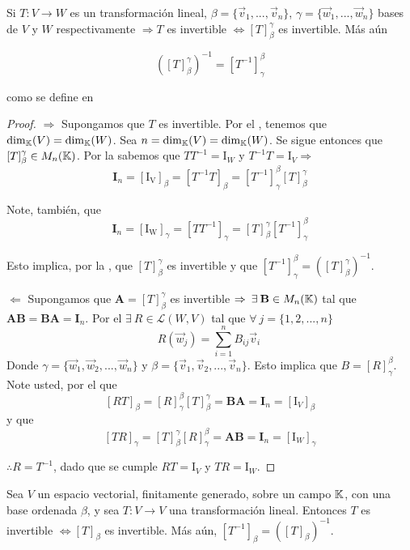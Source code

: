 \begin{theorem} \label{theomostro}
    Si $T : V \to W$ es un transformación lineal, $\beta = \{ \vec{v}_{1}, ..., \vec{v}_{n} \}$, $\gamma = \{ \vec{w}_{1}, ..., \vec{w}_{n} \}$ bases de $V$ y $W$ respectivamente $\Rightarrow T$ es invertible $\iff {[T]}_{\beta}^{\gamma}$ es invertible. Más aún

    $${\left( {[T]}_{\beta}^{\gamma} \right)}^{-1} = {\left[{T}^{-1} \right]}_{\gamma}^{\beta}$$

    como se define en 
\end{theorem}

\begin{proof}
    $\Rightarrow$ Supongamos que $T$ es invertible. Por el , tenemos que $\dim_{\mathbb{K}}(V)=\dim_{\mathbb{K}}(W)$. Sea $n=\dim_{\mathbb{K}}(V)=\dim_{\mathbb{K}}(W)$. Se sigue entonces que $[T]_{\beta}^{\gamma} \in M_{n}(\mathbb{K})$. Por la  sabemos que $TT^{-1}=\mathrm{I}_W $ y $ T^{-1}T=\mathrm{I}_V \Rightarrow$     
    $$ {\textbf{I}}_{n}=[\mathrm{I_V}]_{\beta}=[T^{-1}T]_{\beta}=[T^{-1}]_{\gamma}^{\beta} [T]_{\beta}^{\gamma}$$ 
    
    Note, también, que 
    $${\textbf{I}}_{n}=[\mathrm{I_W}]_{\gamma}=[TT^{-1}]_{\gamma}=[T]_{\beta}^{\gamma} [T^{-1}]_{\gamma}^{\beta}$$ 
    
    Esto implica, por la  , que $[T]_{\beta}^{\gamma}$ es invertible y que $[T^{-1}]_{\gamma}^{\beta}=([T]_{\beta}^{\gamma})^{-1}$. 
    
    $\Leftarrow$ Supongamos que $\textbf{A}=[T]_{\beta}^{\gamma}$ es invertible $\Rightarrow \: \exists \: \textbf{B} \in M_n(\mathbb{K})$ tal que $\textbf{AB}=\textbf{BA}={\textbf{I}}_{n}$. Por el  $\exists \: R \in \mathscr{L}(W,V)$ tal que $\forall \:  j=\{1,2,...,n\}$
    $$R(\vec{w}_j)=\sum_{i=1}^nB_{ij}\vec{v}_i \ $$ 
    Donde $\gamma=\{\vec{w}_1,\vec{w}_2,...,\vec{w}_n\}$ y $\beta=\{\vec{v}_1,\vec{v}_2,...,\vec{v}_n\}$. Esto implica que $B=[R]_{\gamma}^{\beta}$. Note usted, por el  que 
    $$[RT]_{\beta}=[R]_{\gamma}^{\beta}[T]_{\beta}^{\gamma}=\textbf{BA}={\textbf{I}}_{n}=[\mathrm{I}_V]_\beta$$ 
    y que 
    $$[TR]_{\gamma}=[T]_{\beta}^{\gamma}[R]_{\gamma}^{\beta}=\textbf{AB}={\textbf{I}}_{n}=[\mathrm{I}_W]_\gamma$$ 
    
    $\therefore R=T^{-1}$, dado que se cumple $RT=\mathrm{I}_V $ y $ TR=\mathrm{I}_W$. 
\end{proof}

\begin{corollary}
    Sea $V$ un espacio vectorial, finitamente generado, sobre un campo $\mathbb{K}$, con una base ordenada $\beta$, y sea $T:V\to V$ una transformación lineal. Entonces $T$ es invertible $\iff [T]_{\beta}$ es invertible. Más aún, $[T^{-1}]_{\beta}=\left([T]_{\beta}\right)^{-1}$.  
\end{corollary}

